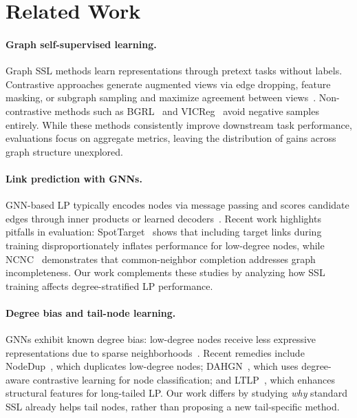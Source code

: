 \section{Related Work}
\label{sec:related}

\paragraph{Graph self-supervised learning.}
Graph SSL methods learn representations through pretext tasks without labels. Contrastive approaches generate augmented views via edge dropping, feature masking, or subgraph sampling and maximize agreement between views~\cite{you2020graph, zhu2021graph}. Non-contrastive methods such as BGRL~\cite{thakoor2022large} and VICReg~\cite{bardes2022vicreg} avoid negative samples entirely. While these methods consistently improve downstream task performance, evaluations focus on aggregate metrics, leaving the distribution of gains across graph structure unexplored.

\paragraph{Link prediction with GNNs.}
GNN-based LP typically encodes nodes via message passing and scores candidate edges through inner products or learned decoders~\cite{zhang2018link, kipf2016variational}. Recent work highlights pitfalls in evaluation: SpotTarget~\cite{chen2024spottarget} shows that including target links during training disproportionately inflates performance for low-degree nodes, while NCNC~\cite{wang2024neural} demonstrates that common-neighbor completion addresses graph incompleteness. Our work complements these studies by analyzing how SSL training affects degree-stratified LP performance.

\paragraph{Degree bias and tail-node learning.}
GNNs exhibit known degree bias: low-degree nodes receive less expressive representations due to sparse neighborhoods~\cite{tang2020investigating}. Recent remedies include NodeDup~\cite{guo2024nodedup}, which duplicates low-degree nodes; DAHGN~\cite{liu2024dahgn}, which uses degree-aware contrastive learning for node classification; and LTLP~\cite{wang2024ltlp}, which enhances structural features for long-tailed LP. Our work differs by studying \emph{why} standard SSL already helps tail nodes, rather than proposing a new tail-specific method.
